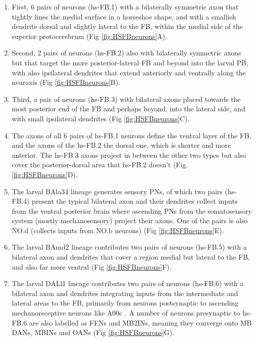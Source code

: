         \begin{enumerate}
            \item First, 6 pairs of neurons (hs-FB.1) with a bilaterally symmetric axon that tightly lines the medial surface in a horseshoe shape, and with a smallish dendrite dorsal and slightly lateral to the FB, within the medial side of the superior protocerebrum (Fig \ref{fig:HSFBneurons}A). 
            \item Second, 2 pairs of neurons (hs-FB.2) also with bilaterally symmetric axons but that target the more posterior-lateral FB and beyond into the larval PB, with also ipsilateral dendrites that extend anteriorly and ventrally along the neuraxis (Fig \ref{fig:HSFBneurons}B).
            \item Third, a pair of neurons (hs-FB.3) with bilateral axons placed towards the most posterior end of the FB and perhaps beyond, into the lateral side, and with small ipsilateral dendrites (Fig \ref{fig:HSFBneurons}C).
            \item The axons of all 6 pairs of hs-FB.1 neurons define the ventral layer of the FB, and the axons of the hs-FB.2 the dorsal one, which is shorter and more anterior. The hs-FB.3 axons project in between the other two types but also cover the posterior-dorsal area that hs-FB.2 doesn't (Fig. \ref{fig:HSFBneurons}D).  
            \item The larval BAla34 lineage generates sensory PNs, of which two pairs (hs-FB.4) present the typical bilateral axon and their dendrites collect inputs from the ventral posterior brain where ascending PNs from the somatosensory system (mostly mechanosensory) project their axons. One of the pairs is also NO.d (collects inputs from NO.b neurons) (Fig \ref{fig:HSFBneurons}E).
            \item The larval BAmd2 lineage contributes two pairs of neurons (hs-FB.5) with a bilateral axon and dendrites that cover a region medial but lateral to the FB, and also far more ventral (Fig \ref{fig:HSFBneurons}F).
            \item The larval DALl1 lineage contributes two pairs of neurons (hs-FB.6) with a bilateral axon and dendrites integrating inputs from the intermediate and lateral areas to the FB, primarily from neurons postsynaptic to ascending mechanoreceptive neurons like A00c \citep{ohyama2015multilevel}. A number of neurons presynaptic to hs-FB.6 are also labelled as FFNs and MB2INs, meaning they converge onto MB DANs, MBINs and OANs \citep{eschbach2020recurrent} (Fig \ref{fig:HSFBneurons}G).

\end{enumerate}
